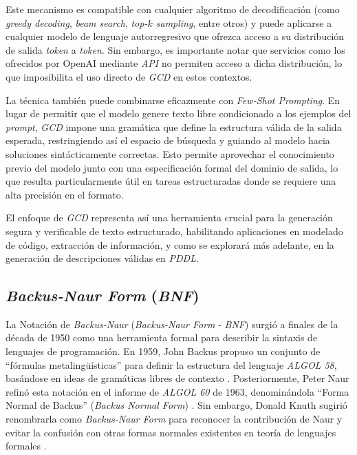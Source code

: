 Este mecanismo es compatible con cualquier algoritmo de decodificación (como \textit{greedy decoding}, \textit{beam search}, \textit{top-$k$ sampling}, entre otros) y puede aplicarse a cualquier modelo de lenguaje autorregresivo que ofrezca acceso a su distribución de salida \textit{token} a \textit{token}. Sin embargo, es importante notar que servicios como los ofrecidos por OpenAI mediante \textit{API} no permiten acceso a dicha distribución, lo que imposibilita el uso directo de \textit{GCD} en estos contextos.

La técnica también puede combinarse eficazmente con \textit{Few-Shot Prompting}. En lugar de permitir que el modelo genere texto libre condicionado a los ejemplos del \textit{prompt}, \textit{GCD} impone una gramática que define la estructura válida de la salida esperada, restringiendo así el espacio de búsqueda y guiando al modelo hacia soluciones sintácticamente correctas. Esto permite aprovechar el conocimiento previo del modelo junto con una especificación formal del dominio de salida, lo que resulta particularmente útil en tareas estructuradas donde se requiere una alta precisión en el formato.

El enfoque de \textit{GCD} representa así una herramienta crucial para la generación segura y verificable de texto estructurado, habilitando aplicaciones en modelado de código, extracción de información, y como se explorará más adelante, en la generación de descripciones válidas en \textit{PDDL}.

\subsection{\textit{Backus-Naur Form} (\textit{BNF})}

La Notación de \textit{Backus-Naur} (\textit{Backus-Naur Form} - \textit{BNF}) surgió a finales de la década de 1950 como una herramienta formal para describir la sintaxis de lenguajes de programación. En 1959, John Backus propuso un conjunto de ``fórmulas metalingüísticas'' para definir la estructura del lenguaje \textit{ALGOL 58}, basándose en ideas de gramáticas libres de contexto \parencite{backus1959syntax}. Posteriormente, Peter Naur refinó esta notación en el informe de \textit{ALGOL 60} de 1963, denominándola ``Forma Normal de Backus'' (\textit{Backus Normal Form}) \parencite{backus1963revised}. Sin embargo, Donald Knuth sugirió renombrarla como \textit{Backus-Naur Form} para reconocer la contribución de Naur y evitar la confusión con otras formas normales existentes en teoría de lenguajes formales \parencite{knuth1964backus}.

